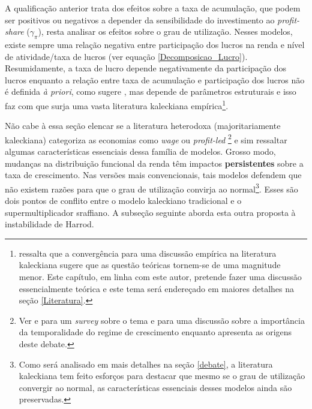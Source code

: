 A qualificação anterior trata dos efeitos sobre a taxa de acumulação, que podem ser positivos ou negativos a depender da sensibilidade do investimento ao \textit{profit-share} ($\gamma_{\pi}$), resta analisar os efeitos sobre o grau de utilização. Nesses modelos, existe sempre uma relação negativa entre participação dos lucros na renda e nível de atividade/taxa de lucros (ver equação \ref{Decomposicao_Lucro}). Resumidamente, a taxa de lucro depende negativamente da participação dos lucros enquanto a relação entre taxa de acumulação e participação dos lucros não é definida \textit{à priori}, como sugere \textcite{bhaduri_unemployment_1990}, mas depende de parâmetros estruturais e isso faz com que surja uma vasta literatura kaleckiana empírica\footnote{\textcite{pariboni_autonomous_2015} ressalta que a convergência para uma discussão empírica na literatura kaleckiana sugere que as questão teóricas tornem-se de uma magnitude menor. Este capítulo, em linha com este autor, pretende fazer uma discussão essencialmente teórica e este tema será endereçado em maiores detalhes na seção \ref{Literatura}.}.


Não  cabe à essa seção elencar se a  literatura heterodoxa (majoritariamente kaleckiana)  categoriza as economias como \textit{wage} ou \textit{profit-led}
\footnote{Ver 
	\textcite{blecker_distribution_2002} 
	e \textcite{onaran_is_2013} para um  \textit{survey} sobre o tema e \textcite{blecker_wage_led_2016} para uma discussão sobre a importância da temporalidade do regime de crescimento enquanto \textcite{lavoie_origins_2017} apresenta as origens deste debate.} 
e sim ressaltar algumas  características essenciais dessa família de modelos. Grosso modo, mudanças na distribuição funcional da renda têm impactos \textbf{persistentes} sobre a taxa de crescimento. Nas versões mais convencionais, tais modelos defendem que não existem razões para que o grau de utilização convirja ao normal\footnote{Como será analisado em mais detalhes na seção \ref{debate}, a literatura kaleckiana tem feito esforços para destacar que mesmo se o grau de utilização convergir ao normal, as características essenciais desses modelos ainda são preservadas.}. Esses são dois pontos de conflito entre o modelo kaleckiano tradicional e o supermultiplicador sraffiano. A subseção seguinte aborda esta outra proposta à instabilidade de Harrod.
